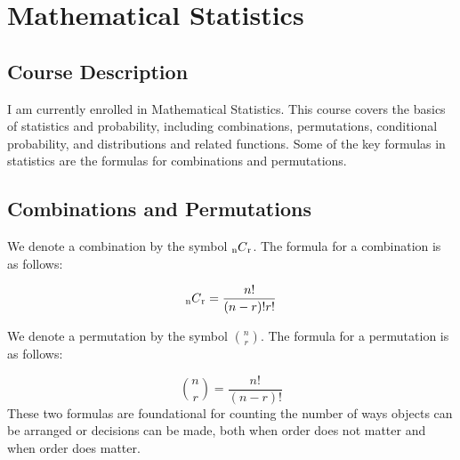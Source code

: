 \documentclass[12pt]{article}
\begin{document}
\section{Mathematical Statistics}
\subsection{Course Description}
I am currently enrolled in Mathematical Statistics. This course covers the basics of statistics and probability, including combinations, permutations, conditional probability, and distributions and related functions. Some of the key formulas in statistics are the formulas for combinations and permutations.
\subsection{Combinations and Permutations}
We denote a combination by the symbol \(\textsubscript{n}C\textsubscript{r}\). The formula for a combination is as follows:


\[\textsubscript{n}C\textsubscript{r}=\frac{n!}{(n-r)!r!}\]

\noindent We denote a permutation by the symbol \(\displaystyle {n \choose r}\). The formula for a permutation is as follows:

\[{n \choose r}=\frac{n!}{(n-r)!}\]
These two formulas are foundational for counting the number of ways objects can be arranged or decisions can be made, both when order does not matter and when order does matter.
\cite{miller2004john}



\end{document}
